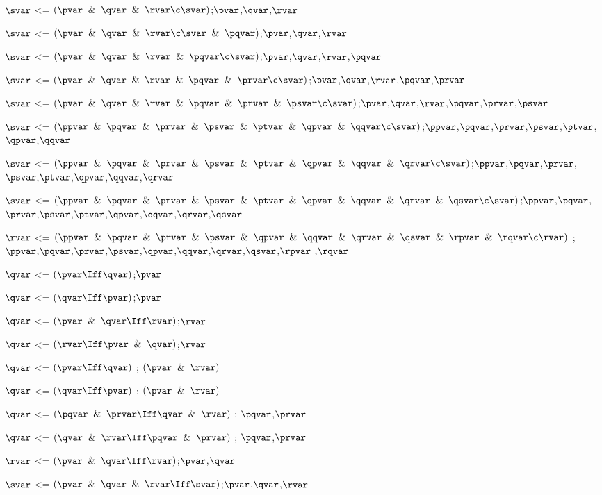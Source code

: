 $\svar$ <=  $(\pvar \And \qvar\And \rvar\c \svar)$;$\pvar$,$\qvar$,$\rvar$

$\svar$ <=  $(\pvar \And \qvar\And \rvar\c \svar \And \pqvar)$;$\pvar$,$\qvar$,$\rvar$

$\svar$ <=  $(\pvar \And \qvar\And \rvar \And \pqvar\c \svar)$;$\pvar$,$\qvar$,$\rvar$,$\pqvar$

$\svar$ <=  $(\pvar \And \qvar\And \rvar \And \pqvar\And \prvar\c \svar)$;$\pvar$,$\qvar$,$\rvar$,$\pqvar$,$\prvar$

$\svar$ <=  $(\pvar \And \qvar\And \rvar \And \pqvar\And \prvar \And \psvar\c \svar)$;$\pvar$,$\qvar$,$\rvar$,$\pqvar$,$\prvar$,$\psvar$

$\svar$ <= $(\ppvar \And \pqvar \And \prvar \And \psvar \And \ptvar \And \qpvar \And \qqvar \c \svar)$;$\ppvar $,$\pqvar $,$\prvar $,$\psvar $,$\ptvar $,$\qpvar $,$\qqvar$

$\svar$ <= $(\ppvar \And \pqvar \And \prvar \And \psvar \And \ptvar \And \qpvar \And \qqvar\And \qrvar \c \svar)$;$\ppvar $,$\pqvar $,$\prvar $,$\psvar $,$\ptvar $,$\qpvar $,$\qqvar$,$\qrvar$

 $\svar$ <= $(\ppvar \And \pqvar \And \prvar \And \psvar \And \ptvar \And \qpvar \And \qqvar \And \qrvar \And \qsvar \c \svar)$;$\ppvar $,$\pqvar $,$\prvar $,$\psvar $,$\ptvar $,$\qpvar $,$\qqvar$,$\qrvar$,$\qsvar$

 $\rvar$ <= $(\ppvar \And \pqvar \And \prvar \And \psvar \And \qpvar \And \qqvar \And \qrvar \And \qsvar \And \rpvar \And \rqvar \c \rvar)$ ;  $\ppvar $,$  \pqvar $,$  \prvar $,$  \psvar $,$  \qpvar $,$  \qqvar $,$  \qrvar $,$  \qsvar $,$  \rpvar $ ,$ \rqvar$

$\qvar$ <=  $(\pvar \Iff \qvar)$;$\pvar$

$\qvar$ <=  $(\qvar \Iff \pvar)$;$\pvar$

$\qvar$ <= $(\pvar \And \qvar \Iff \rvar)$;$\rvar$

$\qvar$ <= $(\rvar \Iff \pvar \And \qvar )$;$\rvar$

$\qvar$ <= $(\pvar \Iff \qvar )$ ; $(\pvar \And \rvar)$

$\qvar$ <= $(\qvar \Iff\pvar)$ ; $(\pvar \And \rvar)$

$\qvar$ <= $(\pqvar \And \prvar \Iff \qvar \And \rvar)$ ; $\pqvar$,$\prvar$

$\qvar$ <= $( \qvar \And \rvar\Iff \pqvar \And \prvar )$ ; $\pqvar$,$\prvar$

$\rvar$ <=  $(\pvar \And \qvar\Iff \rvar)$;$\pvar$,$\qvar$

$\svar$ <=  $(\pvar \And \qvar\And \rvar\Iff \svar)$;$\pvar$,$\qvar$,$\rvar$

